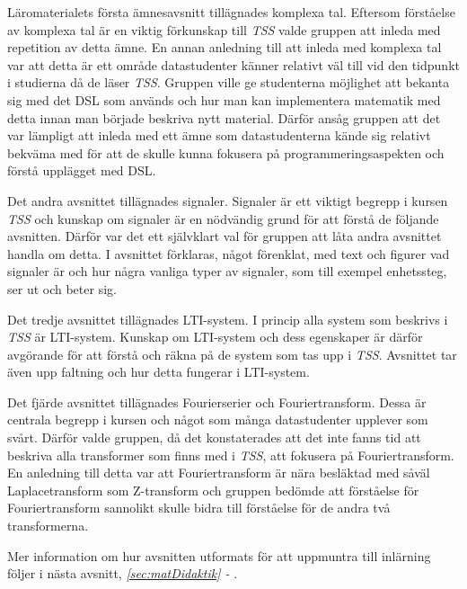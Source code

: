 \documentclass[12pt,a4paper,twoside,openright]{article}
\begin{document}
Läromaterialets första ämnesavsnitt tillägnades komplexa tal. Eftersom
förståelse av komplexa tal är en viktig förkunskap till \textit{TSS}
valde gruppen att inleda med repetition av detta ämne. En annan
anledning till att inleda med komplexa tal var att detta är ett område
datastudenter känner relativt väl till vid den tidpunkt i studierna då
de läser \textit{TSS}. Gruppen ville ge studenterna möjlighet att
bekanta sig med det DSL som används och hur man kan implementera
matematik med detta innan man började beskriva nytt material. Därför
ansåg gruppen att det var lämpligt att inleda med ett ämne som
datastudenterna kände sig relativt bekväma med för att de skulle kunna
fokusera på programmeringsaspekten och förstå upplägget med DSL.

Det andra avsnittet tillägnades signaler. Signaler är ett viktigt
begrepp i kursen \textit{TSS} och kunskap om signaler är en nödvändig
grund för att förstå de följande avsnitten. Därför var det ett
självklart val för gruppen att låta andra avsnittet handla om detta. I
avsnittet förklaras, något förenklat, med text och figurer vad
signaler är och hur några vanliga typer av signaler, som till exempel
enhetssteg, ser ut och beter sig.

Det tredje avsnittet tillägnades LTI-system. I princip alla system som
beskrivs i \textit{TSS} är LTI-system. Kunskap om LTI-system och dess
egenskaper är därför avgörande för att förstå och räkna på de system
som tas upp i \textit{TSS}. Avsnittet tar även upp faltning och hur
detta fungerar i LTI-system.

Det fjärde avsnittet tillägnades Fourierserier och
Fouriertransform. Dessa är centrala begrepp i kursen och något som
många datastudenter upplever som svårt. Därför valde gruppen, då det
konstaterades att det inte fanns tid att beskriva alla transformer som
finns med i \textit{TSS}, att fokusera på Fouriertransform. En anledning till
detta var att Fouriertransform är nära besläktad med såväl
Laplacetransform som Z-transform och gruppen bedömde att
förståelse för Fouriertransform sannolikt skulle bidra till
förståelse för de andra två transformerna.

Mer information om hur avsnitten utformats för att uppmuntra till
inlärning följer i nästa avsnitt, \textit{\ref{sec:matDidaktik} - }.
\end{document}
